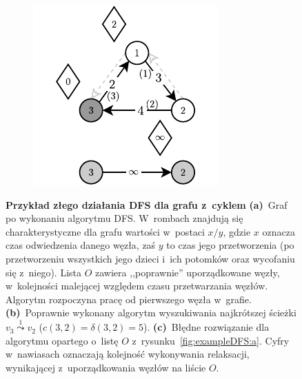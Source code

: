 \begin{figure}[!htbp]
\begin{subfigure}[b]{0.25\textwidth}
		\caption{}
		\label{fig:exampleDFS:b}
	\end{subfigure}
	\hfill
	\begin{subfigure}[b]{0.25\textwidth}
		\includegraphics[width=\textwidth]{Chapter_II/BFS-TOPOLOGICAL-SORT-Example/c.pdf}
		\caption{}
		\label{fig:exampleDFS:c}
	\end{subfigure}
	\hfill\null
	\caption{
		\textbf{Przykład złego działania \textsf{DFS} dla grafu z~cyklem}
		\textbf{(a)}~Graf po wykonaniu algorytmu \textsf{DFS}.
		W~rombach znajdują się charakterystyczne dla grafu wartości w~postaci $x/y$, gdzie $x$ oznacza czas odwiedzenia danego węzła, zaś $y$ to czas jego przetworzenia (po przetworzeniu wszystkich jego dzieci i~ich potomków oraz wycofaniu się z~niego).
		Lista $O$ zawiera ,,poprawnie'' uporządkowane węzły, w~kolejności malejącej względem czasu przetwarzania węzłów.
		Algorytm rozpoczyna pracę od pierwszego węzła w~grafie.
		\textbf{(b)}~Poprawnie wykonany algorytm wyszukiwania najkrótszej ścieżki $v_{3} \overset{1} \leadsto v_{2}$ ($c \left( 3, 2 \right) = \delta \left( 3, 2 \right) = 5$).
		\textbf{(c)}~Błędne rozwiązanie dla algorytmu opartego o~listę $O$ z~rysunku~\ref{fig:exampleDFS:a}.
		Cyfry w~nawiasach oznaczają kolejność wykonywania relaksacji, wynikającej z~uporządkowania węzłów na liście $O$.
	}
	\label{fig:exampleDFS}
\end{figure}


